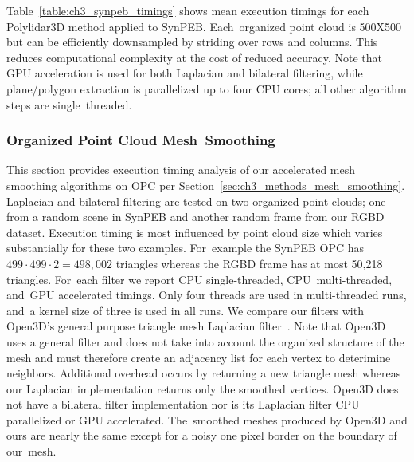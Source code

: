 Table~\ref{table:ch3_synpeb_timings} shows mean execution timings for each Polylidar3D method applied to SynPEB.  Each~organized point cloud is 500X500 but can be efficiently downsampled by striding over rows and columns. This reduces computational complexity at the cost of reduced accuracy. Note that GPU acceleration is used for both Laplacian and bilateral filtering, while plane/polygon extraction is parallelized up to four CPU cores; all other algorithm steps are single~threaded. 

\begin{table}[H]
\centering
\caption{Mean Execution Timings (ms) and Accuracy of Polylidar3D on~SynPEB.}
\label{table:ch3_synpeb_timings}
\end{table}
\unskip


\subsubsection{Organized Point Cloud Mesh~Smoothing}

This section provides execution timing analysis of our accelerated mesh smoothing algorithms on \ac{OPC} per Section~\ref{sec:ch3_methods_mesh_smoothing}. Laplacian and bilateral filtering are tested on two organized point clouds; one from a random scene in SynPEB and another random frame from our \ac{RGBD} dataset.  Execution timing is most influenced by point cloud size which varies substantially for these two examples. For~example the SynPEB \ac{OPC} has $499 \cdot 499 \cdot 2 = 498,002$ triangles whereas the \ac{RGBD} frame has at most 50,218 triangles. For~each filter we report CPU single-threaded, CPU~multi-threaded, and~GPU accelerated timings. Only four threads are used in multi-threaded runs, and~a kernel size of three is used in all runs. We compare our filters with Open3D's general purpose triangle mesh Laplacian filter~\cite{zhou_open3d_2018}. Note that Open3D uses a general filter and does not take into account the organized structure of the mesh and must therefore create an adjacency list for each vertex to deterimine neighbors. Additional overhead occurs by returning a new triangle mesh whereas our Laplacian implementation returns only the smoothed vertices. Open3D does not have a bilateral filter implementation nor is its Laplacian filter CPU parallelized or GPU accelerated. The~smoothed meshes produced by Open3D and ours are nearly the same except for a noisy one pixel border on the boundary of our~mesh.  

